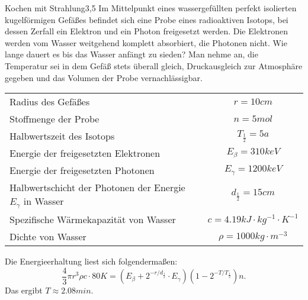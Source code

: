 \begin{problem}{Kochen mit Strahlung}{3,5}
Im Mittelpunkt eines wassergefüllten perfekt isolierten kugelförmigen Gefäßes befindet sich eine Probe eines radioaktiven Isotops, bei dessen Zerfall ein Elektron und ein Photon freigesetzt werden. Die Elektronen werden vom Wasser weitgehend komplett absorbiert, die Photonen nicht. Wie lange dauert es bis das Wasser anfängt zu sieden? Man nehme an, die Temperatur sei in dem Gefäß stets überall gleich, Druckausgleich zur Atmosphäre gegeben und das Volumen der Probe vernachlässigbar.
\begin{center}
\begin{tabular}{lc}
\toprule
Radius des Gefäßes & $r = 10 \unit{cm}$\\
Stoffmenge der Probe & $n = 5 \unit{mol}$\\
Halbwertszeit des Isotops & $T_{\frac12} = 5 \unit{a}$\\
Energie der freigesetzten Elektronen & $E_\beta = 310 \unit{keV}$\\
Energie der freigesetzten Photonen & $E_\gamma = 1200 \unit{keV}$\\
Halbwertschicht der Photonen der Energie $E_\gamma$ in Wasser & $d_{\frac12} = 15 \unit{cm}$\\
Spezifische Wärmekapazität von Wasser & $c = 4.19 \unit{kJ \cdot kg^{-1} \cdot K^{-1}}$\\
Dichte von Wasser & $\rho = 1000 \unit{kg \cdot m^{-3}}$\\
\bottomrule
\end{tabular}
\end{center}
\begin{solution}
Die Energieerhaltung liest sich folgendermaßen:
\[
\frac43 \pi r^3 \rho c \cdot 80 \unit{K} =
\left( E_\beta+2^{- r / d_\frac12}\cdot E_\gamma \right)
\left( 1 - 2^{- T / T_\frac12} \right) n.
\]
Das ergibt $T \approx 2.08 \unit{min}$.
\end{solution}
\end{problem}


